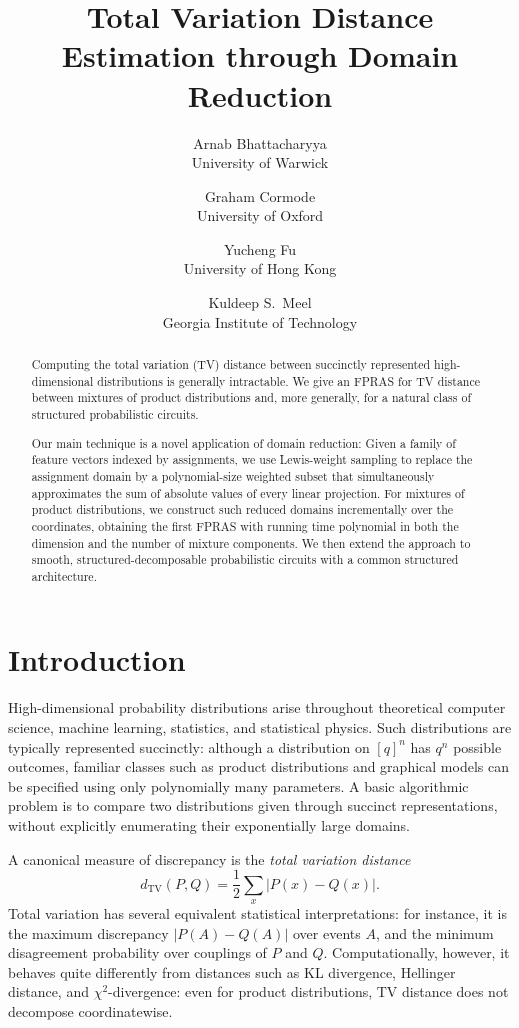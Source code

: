 \documentclass{article}
\title{Total Variation Distance Estimation through Domain Reduction}
\author{Arnab Bhattacharyya\\{\small University of Warwick} \and Graham Cormode\\{\small University of Oxford} \and Yucheng Fu\\{\small University of Hong Kong} \and Kuldeep S.~Meel\\{\small Georgia Institute of Technology}}
\date{}
\begin{document}
\maketitle
\begin{abstract}
Computing the total variation (TV) distance between succinctly represented high-dimensional distributions is generally intractable. We give an FPRAS for TV distance between mixtures of product distributions and, more generally, for a natural class of structured probabilistic circuits.

Our main technique is a novel application of domain reduction: Given a family of feature vectors indexed by assignments, we use Lewis-weight sampling to replace the assignment domain by a polynomial-size weighted subset that simultaneously approximates the sum of absolute values of every linear projection. For mixtures of product distributions, we construct such reduced domains incrementally over the coordinates, obtaining the first FPRAS with running time polynomial in both the dimension and the number of mixture components. We then extend the approach to smooth, structured-decomposable probabilistic circuits with a common structured architecture.
\end{abstract}



\section{Introduction}

High-dimensional probability distributions arise throughout theoretical
computer science, machine learning, statistics, and statistical physics.
Such distributions are typically represented succinctly: although a
distribution on $[q]^n$ has $q^n$ possible outcomes, familiar classes such
as product distributions and graphical models can
be specified using only polynomially many parameters. A basic algorithmic
problem is to compare two distributions given through succinct
representations, without explicitly enumerating their exponentially large
domains.

A canonical measure of discrepancy is the \emph{total variation distance}
\[
    d_{\mathrm{TV}}(P,Q)
    =
    \frac{1}{2}\sum_x |P(x)-Q(x)|.
\]
Total variation has several equivalent statistical interpretations: for
instance, it is the maximum discrepancy $|P(A)-Q(A)|$ over events $A$, and
the minimum disagreement probability over couplings of $P$ and $Q$.
Computationally, however, it behaves quite differently from distances such
as KL divergence, Hellinger distance, and $\chi^2$-divergence: even for
product distributions, TV distance does not decompose coordinatewise.
\end{document}
